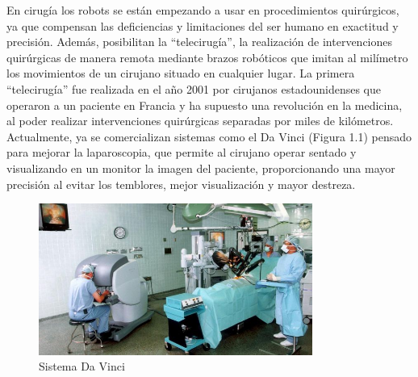 En cirugía los robots se están empezando a usar en procedimientos quirúrgicos, ya que compensan las deficiencias y limitaciones del ser humano en exactitud y precisión. Además, posibilitan la ``telecirugía'', la realización de intervenciones quirúrgicas de manera remota mediante brazos robóticos que imitan al milímetro los movimientos de un cirujano situado en cualquier lugar. La primera ``telecirugía'' fue realizada en el año 2001 por cirujanos estadounidenses que operaron a un paciente en Francia y ha supuesto una revolución en la medicina, al poder realizar intervenciones quirúrgicas separadas por miles de kilómetros. Actualmente, ya se comercializan sistemas como el Da Vinci (Figura 1.1) pensado para mejorar la laparoscopia, que permite al cirujano operar sentado y visualizando en un monitor la imagen del paciente, proporcionando una mayor precisión al evitar los temblores, mejor visualización y mayor destreza.
\begin{figure}[H]
  \begin{center}
    \includegraphics[width=0.8\textwidth]{figures/sistemadavinci.jpg}
		\caption{Sistema Da Vinci}
		\label{fig.sistemadavinci}
		\end{center}
\end{figure}

